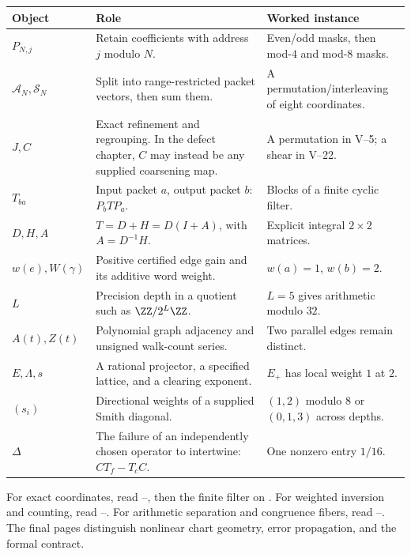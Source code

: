 {\small
\begin{tabularx}{\linewidth}{@{}p{.15\linewidth}Yp{.28\linewidth}@{}}\toprule
\textbf{Object} & \textbf{Role} & \textbf{Worked instance}\\\midrule
$P_{N,j}$ & Retain coefficients with address $j$ modulo $N$. & Even/odd masks, then mod-$4$ and mod-$8$ masks.\\
$\mathcal A_N,\mathcal S_N$ & Split into range-restricted packet vectors, then sum them. & A permutation/interleaving of eight coordinates.\\
$J,C$ & Exact refinement and regrouping. In the defect chapter, $C$ may instead be any supplied coarsening map. & A permutation in V--5; a shear in V--22.\\
$T_{ba}$ & Input packet $a$, output packet $b$: $P_bTP_a$. & Blocks of a finite cyclic filter.\\
$D,H,A$ & $T=D+H=D(I+A)$, with $A=D^{-1}H$. & Explicit integral $2\times2$ matrices.\\
$w(e),W(\gamma)$ & Positive certified edge gain and its additive word weight. & $w(a)=1$, $w(b)=2$.\\
$L$ & Precision depth in a quotient such as $\ZZ/2^L\ZZ$. & $L=5$ gives arithmetic modulo $32$.\\
$A(t),Z(t)$ & Polynomial graph adjacency and unsigned walk-count series. & Two parallel edges remain distinct.\\
$E,\Lambda,s$ & A rational projector, a specified lattice, and a clearing exponent. & $E_+$ has local weight $1$ at $2$.\\
$(s_i)$ & Directional weights of a supplied Smith diagonal. & $(1,2)$ modulo $8$ or $(0,1,3)$ across depths.\\
$\Delta$ & The failure of an independently chosen operator to intertwine: $CT_f-T_cC$. & One nonzero entry $1/16$.\\\bottomrule
\end{tabularx}}

For exact coordinates, read --, then the finite filter on . For weighted inversion and counting, read --. For arithmetic separation and congruence fibers, read --. The final pages distinguish nonlinear chart geometry, error propagation, and the formal contract.


